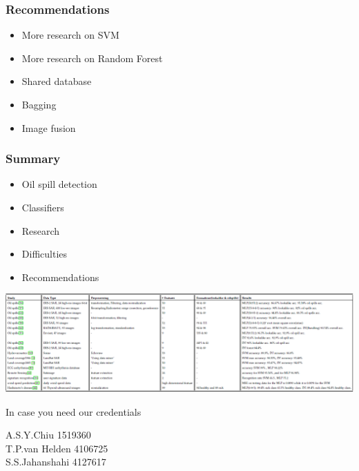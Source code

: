 \documentclass{beamer}
\begin{document}
\begin{frame}
\frametitle{Recommendations}

	\begin{itemize}
		\item More research on SVM
		\item More research on Random Forest
		\item Shared database
		\item Bagging
		\item Image fusion
	\end{itemize}

\end{frame}


\begin{frame}
\frametitle{Summary}

	\begin{itemize}
		\item Oil spill detection
		\item Classifiers
		\item Research
		\item Difficulties
		\item Recommendations
	\end{itemize}

\end{frame}


\begin{frame}

\end{frame}


\begin{frame}

	\includegraphics[width=\textwidth]{./img/table.png}

\end{frame}


\begin{frame}
In case you need our credentials

A.S.Y.Chiu 1519360\\ T.P.van Helden 4106725\\ S.S.Jahanshahi 4127617

\end{frame}

\end{document}
